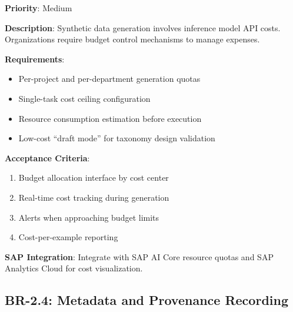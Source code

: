 \begin{tcolorbox}[colback=green!5,colframe=green!70,title=BR-2.3: Budget Control Mechanism]
\textbf{Priority}: Medium

\textbf{Description}: Synthetic data generation involves inference model API
costs. Organizations require budget control mechanisms to manage expenses.

\textbf{Requirements}:
\begin{itemize}
  \item Per-project and per-department generation quotas
  \item Single-task cost ceiling configuration
  \item Resource consumption estimation before execution
  \item Low-cost ``draft mode'' for taxonomy design validation
\end{itemize}

\textbf{Acceptance Criteria}:
\begin{enumerate}
  \item Budget allocation interface by cost center
  \item Real-time cost tracking during generation
  \item Alerts when approaching budget limits
  \item Cost-per-example reporting
\end{enumerate}

\textbf{SAP Integration}: Integrate with SAP AI Core resource quotas and
SAP Analytics Cloud for cost visualization.
\end{tcolorbox}

\subsection{BR-2.4: Metadata and Provenance Recording}

